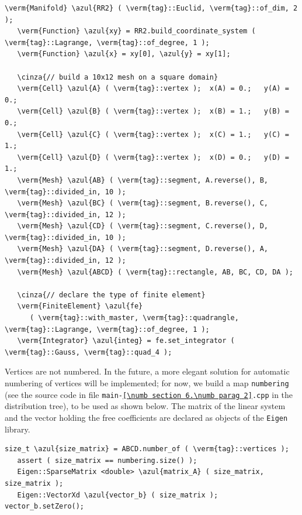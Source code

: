 \begin{Verbatim}[commandchars=\\\{\},formatcom=\small\tt,frame=single,
   label=parag-\ref{\numb section 6.\numb parag 2}.cpp,rulecolor=\color{coment},
   baselinestretch=0.94,framesep=2mm                                            ]
   \verm{Manifold} \azul{RR2} ( \verm{tag}::Euclid, \verm{tag}::of_dim, 2 );
   \verm{Function} \azul{xy} = RR2.build_coordinate_system ( \verm{tag}::Lagrange, \verm{tag}::of_degree, 1 );
   \verm{Function} \azul{x} = xy[0], \azul{y} = xy[1];

   \cinza{// build a 10x12 mesh on a square domain}
   \verm{Cell} \azul{A} ( \verm{tag}::vertex );  x(A) = 0.;   y(A) = 0.;
   \verm{Cell} \azul{B} ( \verm{tag}::vertex );  x(B) = 1.;   y(B) = 0.;
   \verm{Cell} \azul{C} ( \verm{tag}::vertex );  x(C) = 1.;   y(C) = 1.;
   \verm{Cell} \azul{D} ( \verm{tag}::vertex );  x(D) = 0.;   y(D) = 1.;
   \verm{Mesh} \azul{AB} ( \verm{tag}::segment, A.reverse(), B, \verm{tag}::divided_in, 10 );
   \verm{Mesh} \azul{BC} ( \verm{tag}::segment, B.reverse(), C, \verm{tag}::divided_in, 12 );
   \verm{Mesh} \azul{CD} ( \verm{tag}::segment, C.reverse(), D, \verm{tag}::divided_in, 10 );
   \verm{Mesh} \azul{DA} ( \verm{tag}::segment, D.reverse(), A, \verm{tag}::divided_in, 12 );
   \verm{Mesh} \azul{ABCD} ( \verm{tag}::rectangle, AB, BC, CD, DA );

   \cinza{// declare the type of finite element}
   \verm{FiniteElement} \azul{fe}
      ( \verm{tag}::with_master, \verm{tag}::quadrangle, \verm{tag}::Lagrange, \verm{tag}::of_degree, 1 );
   \verm{Integrator} \azul{integ} = fe.set_integrator ( \verm{tag}::Gauss, \verm{tag}::quad_4 );
\end{Verbatim}

Vertices are not numbered. In the future, a more elegant solution for automatic numbering
of vertices will be implemented; for now, we build a map {\small\tt numbering} (see the source
code in file {\small\tt main-\ref{\numb section 6.\numb parag 2}.cpp} in the distribution tree),
to be used as shown below.
The matrix of the linear system and the vector holding the free coefficients
are declared as objects of the {\small\tt Eigen} library.

\begin{Verbatim}[commandchars=\\\{\},formatcom=\small\tt,frame=single,
   label=parag-\ref{\numb section 6.\numb parag 2}.cpp,rulecolor=\color{coment},
   baselinestretch=0.94,framesep=2mm                                            ]
   size_t \azul{size_matrix} = ABCD.number_of ( \verm{tag}::vertices );
   assert ( size_matrix == numbering.size() );
   Eigen::SparseMatrix <double> \azul{matrix_A} ( size_matrix, size_matrix );
   Eigen::VectorXd \azul{vector_b} ( size_matrix );  vector_b.setZero();
\end{Verbatim}

